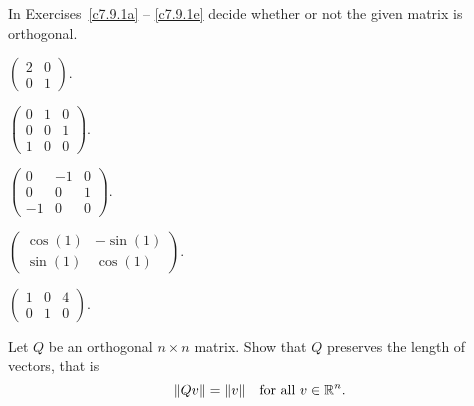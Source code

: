 \documentclass{ximera}
\begin{document}
\noindent In Exercises~\ref{c7.9.1a} -- \ref{c7.9.1e} decide whether or not
the given matrix is orthogonal.
\begin{exercise} \label{c7.9.1a}
$\left(\begin{array}{rr} 2 & 0\\ 0 & 1\end{array}\right)$.
\end{exercise}
\begin{exercise} \label{c7.9.1b}
$\left(\begin{array}{rrr} 0 & 1 & 0\\ 0 & 0 & 1\\
1 & 0 & 0\end{array}\right)$.
\end{exercise}
\begin{exercise} \label{c7.9.1c}
$\left(\begin{array}{rrr} 0 & -1 & 0\\ 0 & 0 & 1\\
-1 & 0 & 0\end{array}\right)$.
\end{exercise}
\begin{exercise} \label{c7.9.1d}
$\left(\begin{array}{rr} \cos(1) & -\sin(1)\\ \sin(1) & \cos(1)
\end{array}\right)$.
\end{exercise}
\begin{exercise} \label{c7.9.1e}
$\left(\begin{array}{rrr} 1 & 0 & 4\\ 0 & 1 & 0
\end{array}\right)$.
\end{exercise}

\begin{exercise} \label{c7.9.2}
Let $Q$ be an orthogonal $n\times n$ matrix.
Show that $Q$ preserves the length of vectors, that is
\[
\|Qv\| = \|v\|\quad \mbox{for all $v\in\mbox{$\Bbb{R}$}^n$.}
\]
\end{exercise}
\end{document}
